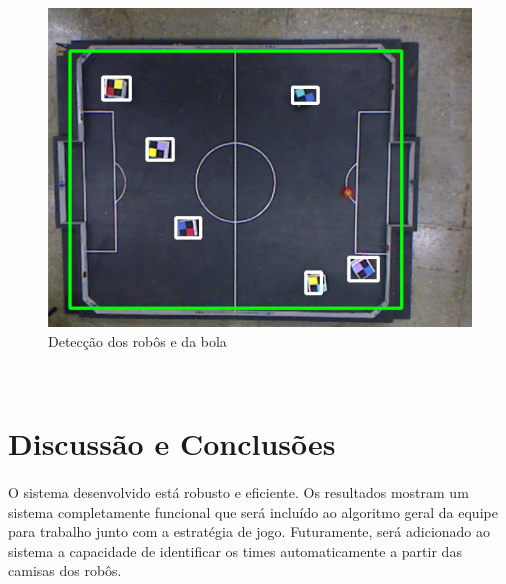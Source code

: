 \documentclass[conference, harvard, brazil, english]{sbatex}
\begin{document}
		\begin{figure}[h]
			\centering
			\includegraphics[scale=0.3]{ball_detection}
			\caption{Detecção dos robôs e da bola}
		\end{figure}\\
		
		
	\section{Discussão e Conclusões}
	\paragraph{}
	O sistema desenvolvido está robusto e eficiente. Os resultados mostram um sistema completamente funcional que será incluído ao algoritmo geral da equipe para trabalho junto com a estratégia de jogo. Futuramente, será adicionado ao sistema a capacidade de identificar os times automaticamente a partir das camisas dos robôs.
\end{document}
